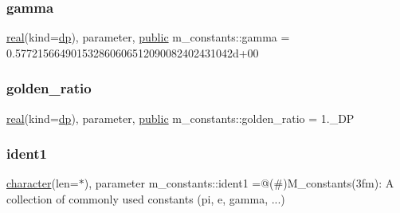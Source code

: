 \mbox{\label{namespacem__constants_a201cd76884fb830c6f8495f821f2a895}} 
\subsubsection{\texorpdfstring{gamma}{gamma}}
{\footnotesize\ttfamily \hyperlink{read__watch_83_8txt_abdb62bde002f38ef75f810d3a905a823}{real}(kind=\hyperlink{namespacem__constants_a15743b6f1a6f57ab5b842d79fbffdd98}{dp}), parameter, \hyperlink{M__stopwatch_83_8txt_a2f74811300c361e53b430611a7d1769f}{public} m\+\_\+constants\+::gamma = 0.\+577215664901532860606512090082402431042d+00}

\mbox{\label{namespacem__constants_a31fdb956c0048479c8d3d37f2b3e3edf}} 
\subsubsection{\texorpdfstring{golden\+\_\+ratio}{golden\_ratio}}
{\footnotesize\ttfamily \hyperlink{read__watch_83_8txt_abdb62bde002f38ef75f810d3a905a823}{real}(kind=\hyperlink{namespacem__constants_a15743b6f1a6f57ab5b842d79fbffdd98}{dp}), parameter, \hyperlink{M__stopwatch_83_8txt_a2f74811300c361e53b430611a7d1769f}{public} m\+\_\+constants\+::golden\+\_\+ratio = 1.\+\_\+\+DP}

\mbox{\label{namespacem__constants_a04d48a101c8ff0dc51bfe39e078339c2}} 
\subsubsection{\texorpdfstring{ident1}{ident1}}
{\footnotesize\ttfamily \hyperlink{option__stopwatch_83_8txt_abd4b21fbbd175834027b5224bfe97e66}{character}(len=$\ast$), parameter m\+\_\+constants\+::ident1 =\textquotesingle{}@(\#)M\+\_\+constants(3fm)\+: A collection of commonly used constants (pi, e, gamma, ...)\textquotesingle{}\hspace{0.3cm}{\ttfamily [private]}}

